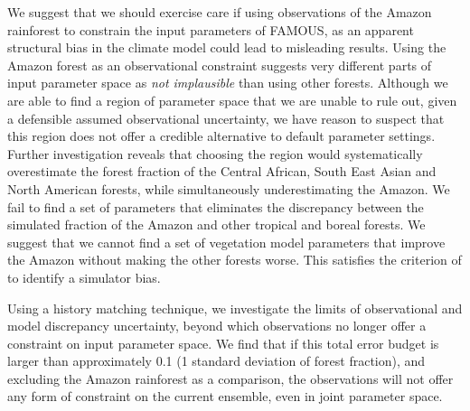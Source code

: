 \documentclass[esd, article]{copernicus} %
\begin{document}
We suggest that we should exercise care if using observations of the Amazon rainforest to constrain the input parameters of FAMOUS, as an apparent structural bias in the climate model could lead to misleading results. Using the Amazon forest as an observational constraint suggests very different parts of input parameter space as \emph{not implausible} than using other forests. Although we are able to find a region of parameter space that we are unable to rule out, given a defensible assumed observational uncertainty, we have reason to suspect that this region does not offer a credible alternative to default parameter settings. Further investigation reveals that choosing the region would systematically overestimate the forest fraction of the Central African, South East Asian and North American forests, while simultaneously underestimating the Amazon. We fail to find a set of parameters that eliminates the discrepancy between the simulated fraction of the Amazon and other tropical and boreal forests. We suggest that we cannot find a set of vegetation model parameters that improve the Amazon without making the other forests worse. This satisfies the criterion of \cite{williamson2014identifying} to identify a simulator bias. 

Using a history matching technique, we investigate the limits of observational and model discrepancy uncertainty, beyond which observations no longer offer a constraint on input parameter space. We find that if this total error budget is larger than approximately 0.1 (1 standard deviation of forest fraction), and excluding the Amazon rainforest as a comparison, the observations will not offer any form of constraint on the current ensemble, even in joint parameter space.

\end{document}
